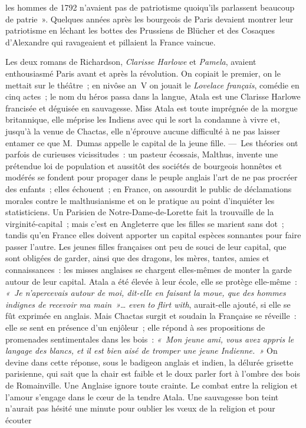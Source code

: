 \documentclass[french,twoside]{book} %
\begin{document}
{\label{p601}les hommes de 1792 n’avaient pas de patriotisme quoiqu’ils parlassent beaucoup de patrie »}. Quelques années après les bourgeois de Paris devaient montrer leur patriotisme en léchant les bottes des Prussiens de Blücher et des Cosaques d’Alexandre qui ravageaient et pillaient la France vaincue.\par
Les deux romans de Richardson, \emph{Clarisse Harlowe} et \emph{Pamela}, avaient enthousiasmé Paris avant et après la révolution. On copiait le premier, on le mettait sur le théâtre ; en nivôse an V on jouait le \emph{Lovelace français}, comédie en cinq actes ; le nom du héros passa dans la langue, Atala est une Clarisse Harlowe francisée et déguisée en sauvagesse. Miss Atala est toute imprégnée de la morgue britannique, elle méprise les Indiens avec qui le sort la condamne à vivre et, jusqu’à la venue de Chactas, elle n’éprouve aucune difficulté à ne pas laisser entamer ce que M. Dumas appelle le capital de la jeune fille. — Les théories ont parfois de curieuses vicissitudes : un pasteur écossais, Malthus, invente une prétendue loi de population et aussitôt des sociétés de bourgeois honnêtes et modérés se fondent pour propager dans le peuple anglais l’art de ne pas procréer des enfants ; elles échouent ; en France, on assourdit le public de déclamations morales contre le malthusianisme et on le pratique au point d’inquiéter les statisticiens. Un Parisien de Notre-Dame-de-Lorette fait la trouvaille de la virginité-capital ; mais c’est en Angleterre que les filles se marient sans dot ; tandis qu’en France elles doivent apporter un capital espèces sonnantes pour faire passer l’autre. Les jeunes filles françaises ont peu de souci de leur capital, que sont obligées de garder, ainsi que des dragons, les mères, tantes, amies et connaissances : les misses anglaises se chargent elles-mêmes de monter la garde autour de leur capital. Atala a été élevée à leur école, elle se protège elle-même : \emph{« Je n’apercevais autour de moi, dit-elle en faisant la moue, que des hommes indignes de recevoir ma main »}… {\itshape even to flirt with}, aurait-elle ajouté, si elle se fût exprimée en anglais. Mais Chactas surgit et soudain la Française se réveille : elle se sent en présence d’un enjôleur ; elle répond à ses propositions de promenades sentimentales dans les bois : \emph{« Mon jeune ami, vous avez appris le langage des blancs, et il est bien aisé de tromper une jeune Indienne. »} On devine dans cette réponse, sous le badigeon anglais et indien, la délurée grisette parisienne, qui sait que la chair est faible et le doux parler fort à l’ombre des bois de Romainville. Une Anglaise ignore toute crainte. Le combat entre la religion et l’amour s’engage dans le cœur de la tendre Atala. Une sauvagesse bon teint n’aurait pas hésité une minute pour oublier les vœux de la religion et pour écouter  
\end{document}
